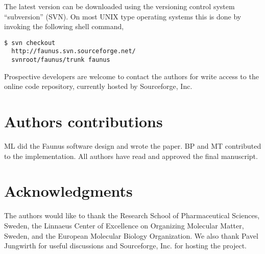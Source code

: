 \documentclass[10pt]{bmc_article}
\newenvironment{bmcformat}{\begin{raggedright}\baselineskip20pt\sloppy\setboolean{publ}{false}}{\end{raggedright}\baselineskip20pt\sloppy}
\begin{document}
\begin{bmcformat}
The latest version can be downloaded using the versioning control system ``subversion'' (SVN).
On most UNIX type operating systems this is done by invoking the following shell command,
\begin{verbatim}
$ svn checkout
  http://faunus.svn.sourceforge.net/
  svnroot/faunus/trunk faunus
\end{verbatim}
Prospective developers are welcome to contact the authors for write access to the online code repository, currently hosted by Sourceforge, Inc.


\section*{Authors contributions}
ML did the Faunus software design and wrote the paper.
BP and MT contributed to the implementation. All
authors have read and approved the final manuscript.

\section*{Acknowledgments}
  The authors would like to thank the Research School of Pharmaceutical Sciences, Sweden, the Linnaeus Center of Excellence on Organizing Molecular Matter, Sweden,
and the European Molecular Biology Organization.
We also thank Pavel Jungwirth for useful discussions and Sourceforge, Inc. for hosting the project.


{
   }     %


\end{bmcformat}
\end{document}
